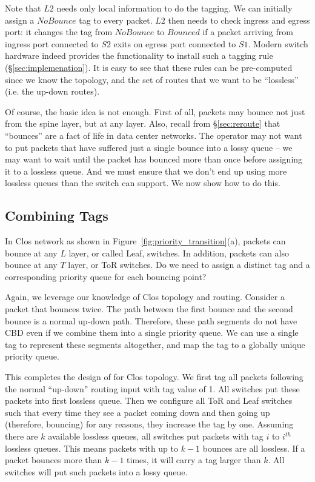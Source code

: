 Note that $L2$ needs only local information to do the tagging. We can initially
assign a $NoBounce$ tag to every packet. $L2$ then needs to check ingress and
egress port: it changes the tag from $NoBounce$ to $Bounced$ if a packet
arriving from ingress port connected to $S2$ exits on egress port connected to
$S1$.  Modern switch hardware indeed provides the functionality to install such
a tagging rule (\S\ref{sec:implemenation}).  It is easy to see that these rules
can be pre-computed since we know the topology, and the set of routes that we
want to be ``lossless'' (i.e. the up-down routes). 

Of course, the basic idea is not enough. First of all, packets may bounce not
just from the spine layer, but at any layer. Also, recall from
\S\ref{sec:reroute} that ``bounces'' are a fact of life in data center networks.
The operator may not want to put packets that have suffered just a single bounce
into a lossy queue -- we may want to wait until the packet has bounced more than
once before assigning it to a lossless queue. And we must ensure that we don't
end up using more lossless queues than the switch can support. We now show how
to do this.

\subsection{Combining Tags}
\label{subsec:combine}

In Clos network as shown in Figure~\ref{fig:priority_transition}(a), packets can
bounce at any $L$ layer, or called Leaf, switches. In addition, packets can also
bounce at any $T$ layer, or ToR switches. Do we need to assign a distinct tag
and a corresponding priority queue for each bouncing point? 

Again, we leverage our knowledge of Clos topology and routing. Consider a packet
that bounces twice. The path between the first bounce and the second bounce is a
normal up-down path. Therefore, these path segments do not have CBD even if we
combine them into a single priority queue. We can use a single tag to represent
these segments altogether, and map the tag to a globally unique priority queue.

This completes the design of \system{} for Clos topology.  We first tag all
packets following the normal ``up-down'' routing input with tag value of 1. All
switches put these packets into first lossless queue. Then we configure all ToR
and Leaf switches such that every time they see a packet coming down and then
going up (therefore, bouncing) for any reasons, they increase the tag by one.
Assuming there are $k$ available lossless queues, all switches put packets with
tag $i$ to $i^{th}$ lossless queues. This means packets with up to $k-1$ bounces
are all lossless. If a packet bounces more than $k-1$ times, it will carry a tag
larger than $k$. All switches will put such packets into a lossy queue.

